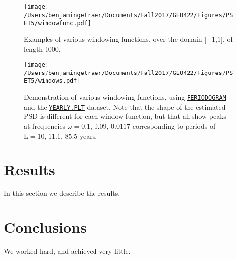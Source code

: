 \documentclass[11pt]{article}
\begin{document}
\begin{figure}[h!]
\texttt{[image: /Users/benjamingetraer/Documents/Fall2017/GEO422/Figures/PSET5/windowfunc.pdf]}
\caption{Examples of various windowing functions, over the domain [$-1$,$1$], of length 1000.}
\label{fig:windows}
\end{figure}

\begin{figure}[h!]
\texttt{[image: /Users/benjamingetraer/Documents/Fall2017/GEO422/Figures/PSET5/windows.pdf]}
\caption{Demonstration of various windowing functions, using \href{https://www.mathworks.com/help/signal/ref/periodogram.html}{\texttt{PERIODOGRAM}} and the \href{http://geoweb.princeton.edu/people/simons/YEARLY.PLT}{\texttt{YEARLY.PLT}} dataset. Note that the shape of the estimated PSD is different for each window function, but that all show peaks at frequencies $\omega=0.1$, $0.09$, $0.0117$ corresponding to periods of $\mathrm{L}=10$, $11.1$, $85.5$ years.}
\label{fig:windows}
\end{figure}



\section{Results}\label{results}
In this section we describe the results.

\section{Conclusions}\label{conclusions}
We worked hard, and achieved very little.
\end{document}
